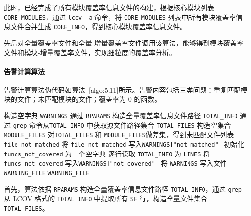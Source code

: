 此时，已经完成了所有模块覆盖率信息文件的构建，根据核心模块列表 \verb|CORE_MODULES|，通过 \verb|lcov -a| 命令，将 \verb|CORE_MODULES| 列表中所有模块覆盖率信息文件合并生成 \verb|CORE_INFO|，得到核心模块覆盖率信息文件。

先后对全量覆盖率文件和全量-增量覆盖率文件调用该算法，能够得到模块覆盖率文件和模块-增量覆盖率文件，实现细粒度的覆盖率分析。

\paragraph{\textbf{告警计算算法}}
告警计算算法伪代码如算法~\ref{algo:5.11}所示。告警内容包括三类问题：重复匹配模块的文件；未匹配模块的文件；覆盖率为 0 的函数。

\begin{algorithm}[ht]
\caption{细粒度分析-解析任务层-模块覆盖率分析算法}
\label{algo:5.11}

构造空字典 \texttt{WARNINGS} \;
通过 \texttt{RPARAMS} 构造全量覆盖率信息文件路径 \texttt{TOTAL\_INFO} \;
通过 \texttt{grep} 命令从\texttt{TOTAL\_INFO} 中获取源文件路径集合 \texttt{TOTAL\_FILES}\;
构造空集合 \texttt{MODULE\_FILES} \;
对\texttt{TOTAL\_FILES} 和 \texttt{MODULE\_FILES}做差集，得到未匹配文件列表\texttt{file\_not\_matched} \;
将 \texttt{file\_not\_matched} 写入\texttt{WARNINGS["not\_matched"]}\;
初始化 \texttt{funcs\_not\_covered} 为一个空字典 \;
逐行读取 \texttt{TOTAL\_INFO} 为 \texttt{LINES} \;
将 \texttt{funcs\_not\_covered} 写入\texttt{WARNINGS["not\_covered"]}\;
将 \texttt{WARNINGS} 写入文件 \texttt{WARNING\_FILE} \;
\Return \texttt{WARNING\_FILE} \;
\end{algorithm}

首先，算法依据 \verb|RPARAMS| 构造全量覆盖率信息文件路径 \verb|TOTAL_INFO|，通过 \verb|grep| 从 LCOV 格式的 \verb|TOTAL_INFO| 中提取所有 \verb|SF| 行，构造全量文件集合 \verb|TOTAL_FILES|。


